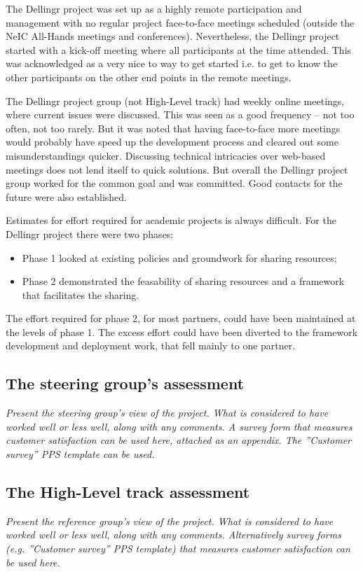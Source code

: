 \documentclass{article}
\newcommand{\dell}{Dellingr\xspace}
\newcommand{\HLT}{High-Level track\xspace}
\begin{document}

The \dell project was set up as a highly remote participation and management with no regular project face-to-face meetings scheduled (outside the NeIC All-Hands meetings and conferences).
Nevertheless, the \dell project started with a kick-off meeting where all participants at the time attended. 
This was acknowledged as a very nice to way to get started i.e. to get to know the other participants on the other end points in the remote meetings.

The \dell project group (not \HLT) had weekly online meetings, where current issues were discussed. 
This was seen as a good frequency -- not too often, not too rarely.
But it was noted that having face-to-face more meetings would probably have speed up the development process and cleared out some misunderstandings quicker. 
Discussing technical intricacies over web-based meetings does not lend itself to quick solutions.
But overall the \dell 
project group worked for the common goal and was committed. 
Good contacts for the future were also established.

Estimates for effort required for academic projects is always difficult.
For the \dell project there were two phases:
\begin{itemize}
\item Phase 1 looked at existing policies and groundwork for sharing resources;
\item Phase 2 demonstrated the feasability of sharing resources and a framework that facilitates the sharing.
\end{itemize}
The effort required for phase 2, for most partners, could have been maintained at the levels of phase 1.
The excess effort could have been diverted to the framework development and deployment work, that fell mainly to one partner.

\subsection{The steering group’s assessment}
{\it Present the steering group’s view of the project. What is considered to have worked well or less well, along with any comments.  A survey form that measures customer satisfaction can be used here, attached as an appendix. The ”Customer survey” PPS template can be used.}

\subsection{The \HLT assessment}
{\it Present the reference group’s view of the project. What is considered to have worked well or less well, along with any comments.  Alternatively survey forms (e.g. ”Customer survey” PPS template) that measures customer satisfaction can be used here.}
\end{document}
